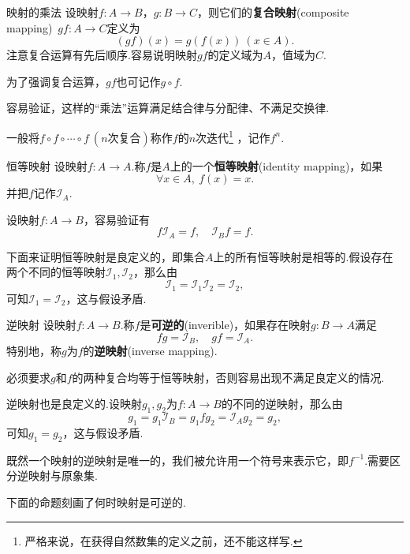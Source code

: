 \documentclass[lang=cn, zihao=5]{elegantbook}
\begin{document}
\begin{definition}{映射的乘法}
    设映射$f:A \to B$，$g:B \to C$，则它们的\textbf{复合映射}(composite mapping)~$gf:A \to C$定义为$$(gf)(x)=g(f(x)) \ (x \in A).$$
    注意复合运算有先后顺序.容易说明映射$gf$的定义域为$A$，值域为$C$.
\end{definition}
\begin{remark}
	为了强调复合运算，$gf$也可记作$g \circ f$.
\end{remark}

容易验证，这样的“乘法”运算满足结合律与分配律、不满足交换律.

一般将$f \circ f \circ \cdots \circ f~(n\textit{次复合})$称作$f$的$n$次迭代\footnote{严格来说，在获得自然数集的定义之前，还不能这样写.} ，记作$f^n$.

\begin{definition}{恒等映射}
	设映射$f:A \to A$.称$f$是$A$上的一个\textbf{恒等映射}(identity mapping)，如果$$\forall x\in A,~f(x)=x.$$
	并把$f$记作$\mathcal{I}_A$.
\end{definition}
\begin{remark}
	设映射$f : A \to B$，容易验证有$$f\mathcal{I}_A=f,\quad \mathcal{I}_Bf=f.$$
\end{remark}

下面来证明恒等映射是良定义的，即集合$A$上的所有恒等映射是相等的.假设存在两个不同的恒等映射$\mathcal{I}_1,\mathcal{I}_2$，那么由$$\mathcal{I}_1 = \mathcal{I}_1 \mathcal{I}_2 = \mathcal{I}_2,$$
可知$\mathcal{I}_1 = \mathcal{I}_2$，这与假设矛盾.

\begin{definition}{逆映射}
	设映射$f:A \to B$.称$f$是\textbf{可逆的}(inverible)，如果存在映射$g:B \to A$满足$$fg=\mathcal{I}_B,\quad gf=\mathcal{I}_A.$$
	特别地，称$g$为$f$的\textbf{逆映射}(inverse mapping).
\end{definition}
\begin{remark}
	必须要求$g$和$f$的两种复合均等于恒等映射，否则容易出现不满足良定义的情况.
\end{remark}

逆映射也是良定义的.设映射$g_1,g_2$为$f:A \to B$的不同的逆映射，那么由$$g_1 = g_1\mathcal{I}_B = g_1fg_2 = \mathcal{I}_Ag_2 = g_2,$$
可知$g_1=g_2$，这与假设矛盾.

既然一个映射的逆映射是唯一的，我们被允许用一个符号来表示它，即$f^{-1}$.需要区分逆映射与原象集.

下面的命题刻画了何时映射是可逆的.
\end{document}
